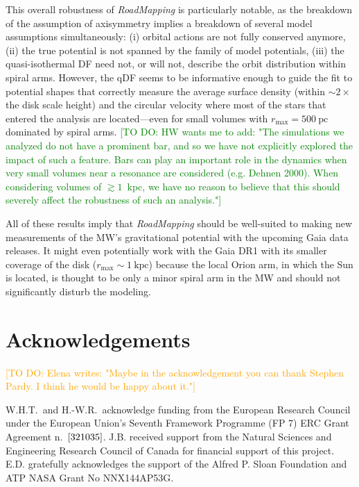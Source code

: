 \documentclass[iop,revtex4,numberedappendix,appendixfloats]{emulateapj}
\newcommand{\RM}{{\sl RoadMapping}}
\newcommand{\HW}[1]{\textcolor{Green}{#1}}
\newcommand{\Elena}[1]{\textcolor{Orange}{#1}}
\begin{document}
This overall robustness of \RM{} is particularly notable, as the breakdown of the assumption of axisymmetry implies a breakdown of several model assumptions simultaneously: (i) orbital actions are not fully conserved anymore, (ii) the true potential is not spanned by the family of model potentials, (iii) the quasi-isothermal DF need not, or will not, describe the orbit distribution within spiral arms. However, the qDF seems to be informative enough to guide the fit to potential shapes that correctly measure the average surface density (within $\sim2 \times$ the disk scale height) and the circular velocity where most of the stars that entered the analysis are located---even for small volumes with $r_\text{max}=500~\text{pc}$ dominated by spiral arms. \HW{[TO DO: HW wants me to add: "The simulations we analyzed do not have a prominent bar, and so we have not explicitly explored the impact of such a feature. Bars can play an important role in the dynamics when very small volumes near a resonance are considered (e.g. Dehnen 2000). When considering volumes of $\gtrsim 1$~kpc, we have no reason to believe that this should severely affect the robustness of such an analysis."]}

All of these results imply that \RM{} should be well-suited to making new measurements of the MW's gravitational potential with the upcoming Gaia data releases. It might even potentially work with the Gaia DR1 with its smaller coverage of the disk ($r_\text{max}\sim 1~\text{kpc}$) because the local Orion arm, in which the Sun is located, is thought to be only a minor spiral arm in the MW and should not significantly disturb the modeling. 


\section{Acknowledgements}

\Elena{[TO DO: Elena writes: "Maybe in the acknowledgement you can thank Stephen Pardy. I think he would be happy about it."]}

W.H.T.\ and H.-W.R.~acknowledge funding from the European Research Council under the European Union’s Seventh Framework Programme (FP 7) ERC Grant Agreement n.~${\rm [321035]}$. J.B. received support from the Natural Sciences and Engineering Research Council of Canada for financial support of this project. E.D. gratefully acknowledges the support of the Alfred P. Sloan Foundation and ATP NASA Grant No NNX144AP53G. 


{}

\end{document}
